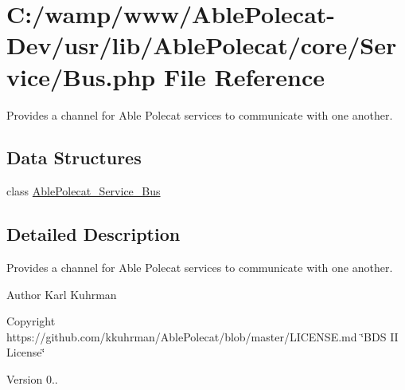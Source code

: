 \hypertarget{_bus_8php}{}\section{C\+:/wamp/www/\+Able\+Polecat-\/\+Dev/usr/lib/\+Able\+Polecat/core/\+Service/\+Bus.php File Reference}
\label{_bus_8php}


Provides a channel for Able Polecat services to communicate with one another.  


\subsection*{Data Structures}
\begin{DoxyCompactItemize}
\item 
class \hyperlink{class_able_polecat___service___bus}{Able\+Polecat\+\_\+\+Service\+\_\+\+Bus}
\end{DoxyCompactItemize}


\subsection{Detailed Description}
Provides a channel for Able Polecat services to communicate with one another. 

\begin{DoxyAuthor}{Author}
Karl Kuhrman 
\end{DoxyAuthor}
\begin{DoxyCopyright}{Copyright}
https\+://github.com/kkuhrman/\+Able\+Polecat/blob/master/\+L\+I\+C\+E\+N\+S\+E.\+md \char`\"{}\+B\+D\+S I\+I License\char`\"{} 
\end{DoxyCopyright}
\begin{DoxyVersion}{Version}
0.. 
\end{DoxyVersion}
